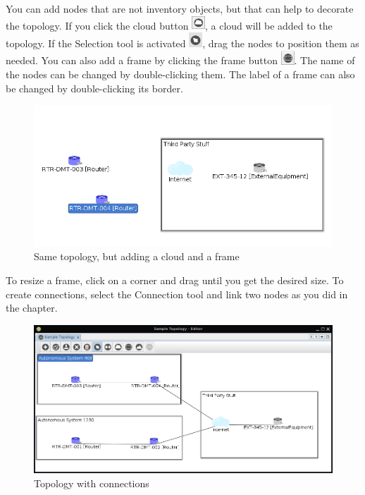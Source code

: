 \documentclass[a4paper]{article}
\begin{document}
		You can add nodes that are not inventory objects, but that can help to decorate the topology. If you click the cloud button \includegraphics[width=0.5cm]{img/icon_cloud.png}, a cloud will be added to the topology. If the Selection tool is activated \includegraphics[width=0.5cm]{img/icon_select_tool.png}, drag the nodes to position them as needed. You can also add a frame by clicking the frame button \includegraphics[width=0.5cm]{img/icon_frame.png}. The name of the nodes can be changed by double-clicking them. The label of a frame can also be changed by double-clicking its border.
		\begin{figure}[h!]
			\centering
			\includegraphics[width=0.8\linewidth]{img/topology_designer_extra_nodes.png}
			\caption{Same topology, but adding a cloud and a frame}
			\label{fig:topology_designer_extra_nodes}
		\end{figure}
		
		To resize a frame, click on a corner and drag until you get the desired size. To create connections, select the Connection tool and link two nodes as you did in the \textbf{} chapter.
		\begin{figure}[h!]
			\centering
			\includegraphics[width=\linewidth]{img/topology_designer_connections.png}
			\caption{Topology with connections}
			\label{fig:topology_designer_connections}
		\end{figure}
		
\end{document}
